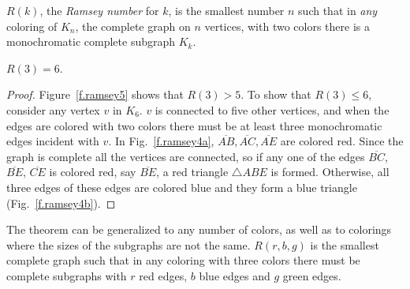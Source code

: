 \begin{definition}
$R(k)$, the \emph{Ramsey number} for $k$, is the smallest number $n$ such that in \emph{any} coloring of $K_{n}$, the complete graph on $n$ vertices, with two colors there is a monochromatic complete subgraph $K_k$.
\end{definition}
\begin{theorem}[Ramsey]
$R(3)=6$.\label{thm.ramsey}
\end{theorem}

\begin{proof}
Figure~\ref{f.ramsey5} shows that $R(3)>5$. To show that $R(3)\leq 6$, consider any vertex $v$ in $K_6$. $v$ is connected to five other vertices, and when the edges are colored with two colors there must be at least three monochromatic edges incident with $v$. In Fig.~\ref{f.ramsey4a}, $\overline{AB}, \overline{AC}, \overline{AE}$ are colored red. Since the graph is complete all the vertices are connected, so if any one of the edges $\overline{BC}$, $\overline{BE}$, $\overline{CE}$ is colored red, say $\overline{BE}$, a red triangle $\triangle ABE$ is formed. Otherwise, all three edges of these edges are colored blue and they form a blue triangle (Fig.~\ref{f.ramsey4b}).
\end{proof}

The theorem can be generalized to any number of colors, as well as to colorings where the sizes of the subgraphs are not the same. $R(r,b,g)$ is the smallest complete graph such that  in any coloring with three colors there must be complete subgraphs with $r$ red edges, $b$ blue edges and $g$ green edges.


